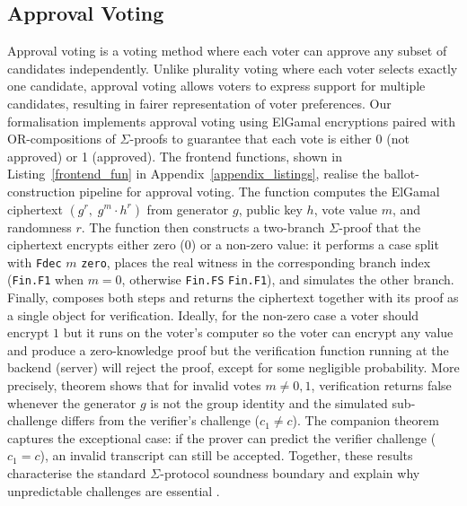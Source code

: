 \documentclass[sigconf,anonymous,review]{acmart}
\begin{document}
\subsection{Approval Voting}
Approval voting is a voting method where each voter can approve any subset of candidates independently. 
Unlike plurality voting where each voter selects exactly one candidate, approval voting allows voters to express 
support for multiple candidates, resulting in fairer representation of voter preferences. Our formalisation 
implements approval voting using ElGamal encryptions paired with OR-compositions of $\Sigma$-proofs to guarantee that 
each vote is either 0 (not approved) or 1 (approved).  The frontend functions, shown in Listing~\ref{frontend_fun} in Appendix~\ref{appendix_listings}, realise the ballot-construction pipeline for approval voting. The function \texttt{} computes the ElGamal ciphertext $(g^r,\; g^m \cdot h^r)$ from generator $g$, public key $h$, vote value $m$, and randomness $r$. The function \texttt{} then constructs a two-branch $\Sigma$-proof that the ciphertext encrypts either zero ($0$) or a non-zero value: it performs a case split with \texttt{Fdec} $m$ \texttt{zero}, places the real witness in the corresponding branch index (\texttt{Fin.F1} when $m=0$, otherwise \texttt{Fin.FS} \texttt{Fin.F1}), and simulates the other branch. Finally, \texttt{} composes both steps and returns the ciphertext together with its proof as a single object for verification. Ideally, for the non-zero case a voter should encrypt $1$ but it runs on the voter's computer so the voter can encrypt any value and produce a zero-knowledge proof but the verification function running at the backend (server) will reject the proof, except for some negligible probability. More precisely, theorem \texttt{} shows that for invalid votes $m \neq 0,1$, verification returns false whenever the generator $g$ is not the group identity and the simulated sub-challenge differs from the verifier's challenge ($c_1 \neq c$). The companion theorem \texttt{} captures the exceptional case: if the prover can predict the verifier challenge ($c_1 = c$), an invalid transcript can still be accepted. Together, these results characterise the standard $\Sigma$-protocol soundness boundary and explain why unpredictable challenges are essential \cite{10.1007/978-3-642-34961-4_38,dao2023weak}. 
\end{document}
